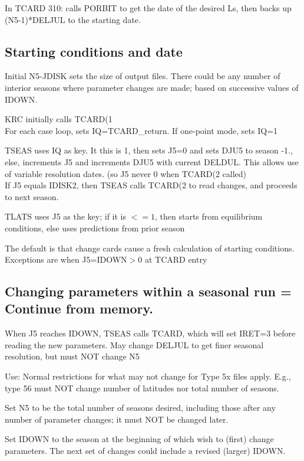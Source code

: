 \documentclass[draft]{article}  %
\begin{document}
In TCARD 310: calls PORBIT to get the date of the desired Ls, then backs up
(N5-1)*DELJUL to the starting date.

\subsection{Starting conditions and date}%

Initial N5-JDISK sets the size of output files. There could be any number of
interior seasons where parameter changes are made; based on successive values of
IDOWN.

KRC initially calls TCARD(1  \\
For each case loop, sets IQ=TCARD\_return. If one-point mode, sets IQ=1

TSEAS uses IQ as key. It this is 1, then sets J5=0 and sets DJU5 to season -1.,
else, increments J5 and increments DJU5 with current DELDUL. This allows use of
variable resolution dates. (so J5 never 0 when TCARD(2 called) \\
If J5 equals IDISK2, then TSEAS calls TCARD(2 to read changes, and proceeds to 
next season. 

TLATS uses J5 as the key; if it is $<= 1$, then starts from equilibrium
conditions, else uses predictions from prior season

The default is that change cards cause a fresh calculation of starting
conditions. Exceptions are when J5=IDOWN$>0$ at TCARD entry

\subsection{Changing parameters within a seasonal run = Continue from memory.}%

When J5 reaches IDOWN, TSEAS calls TCARD, which will set IRET=3 before reading
the new parameters. May change DELJUL to get finer seasonal resolution, but must
NOT change N5

Use: Normal restrictions for what may not change for Type 5x files apply.
E.g., type 56 must NOT change number of latitudes nor total number of seasons.

Set N5 to be the total number of seasons desired, including those
after any number of parameter changes; it must NOT be changed later.

Set IDOWN to the season at the beginning of which wish to (first) change
parameters. The next set of changes could include a revised (larger) IDOWN.
\end{document}
